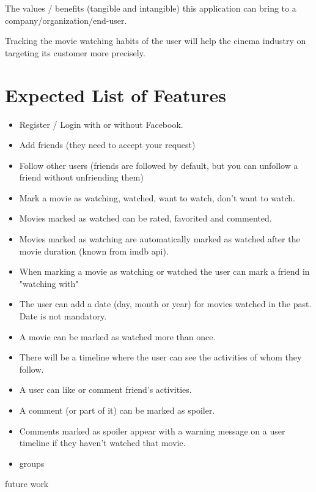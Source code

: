 The values / benefits (tangible and intangible) this application can bring to a
company/organization/end-user.

Tracking the movie watching habits of the user will help the cinema industry
on targeting its customer more precisely.

\section{Expected List of Features}

\begin{itemize}
  \item Register / Login with or without Facebook.
  \item Add friends (they need to accept your request)
  \item Follow other users (friends are followed by default, but you can
    unfollow a friend without unfriending them)
  \item Mark a movie as watching, watched, want to watch, don't want to watch.
  \item Movies marked as watched can be rated, favorited and commented.
  \item Movies marked as watching are automatically marked as watched after the
    movie duration (known from imdb api).
  \item When marking a movie as watching or watched the user can mark a friend
    in "watching with"
  \item The user can add a date (day, month or year) for movies watched in the
    past. Date is not mandatory.
  \item A movie can be marked as watched more than once.
  \item There will be a timeline where the user can see the activities of whom
    they follow.
  \item A user can like or comment friend's activities.
  \item A comment (or part of it) can be marked as spoiler.
  \item Comments marked as spoiler appear with a warning message on a user
    timeline if they haven't watched that movie.
  \item groups
\end{itemize}

future work

